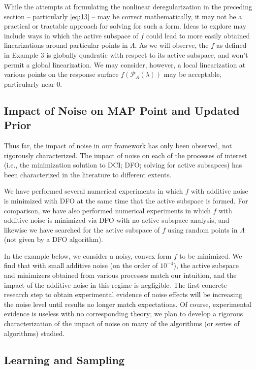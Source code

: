 \documentclass{amsart}
\begin{document}
While the attempts at formulating the nonlinear deregularization in the preceding section -- particularly \eqref{eq:13} -- may be correct mathematically, it may not be a practical or tractable approach for solving for such a form. Ideas to explore may include ways in which the active subspace of $f$ could lead to more easily obtained linearizations around particular points in $\Lambda$. As we will observe, the $f$ as defined in Example 3 is globally quadratic with respect to its active subspace, and won't permit a global linearization. We may consider, however, a local linearization at various points on the response surface $f(\mathcal{P}_A(\lambda))$ may be acceptable, particularly near 0.


\subsection{Impact of Noise on MAP Point and Updated Prior}

Thus far, the impact of noise in our framework has only been observed, not rigorously characterized. The impact of noise on each of the processes of interest (i.e., the minimization solution to DCI; DFO; solving for active subsapces) has been characterized in the literature to different extents. 

We have performed several numerical experiments in which $f$ with additive noise is minimized with DFO at the same time that the active subspace is formed. For comparison, we have also performed numerical experiments in which $f$ with additive noise is minimized via DFO with no active subspace analysis, and likewise we have searched for the active subspace of $f$ using random points in $\Lambda$ (not given by a DFO algorithm).

In the example below, we consider a noisy, convex form $f$ to be minimized. We find that with small additive noise (on the order of $10^{-4}$), the active subspace and minimizers obtained from various processes match our intuition, and the impact of the additive noise in this regime is negligible. The first concrete research step to obtain experimental evidence of noise effects will be increasing the noise level until results no longer match expectations. Of course, experimental evidence is useless with no corresponding theory; we plan to develop a rigorous characterization of the impact of noise on many of the algorithms (or series of algorithms) studied.



\subsection{Learning and Sampling}
\end{document}
